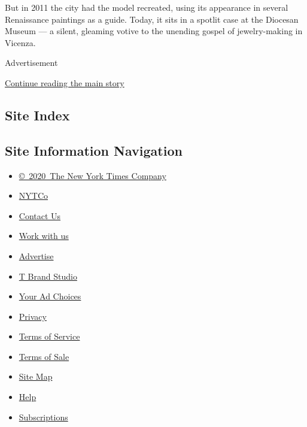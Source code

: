 But in 2011 the city had the model recreated, using its appearance in
several Renaissance paintings as a guide. Today, it sits in a spotlit
case at the Diocesan Museum --- a silent, gleaming votive to the
unending gospel of jewelry-making in Vicenza.

Advertisement

\protect\hyperlink{after-bottom}{Continue reading the main story}

\hypertarget{site-index}{%
\subsection{Site Index}\label{site-index}}

\hypertarget{site-information-navigation}{%
\subsection{Site Information
Navigation}\label{site-information-navigation}}

\begin{itemize}
\tightlist
\item
  \href{https://help.nytimes.com/hc/en-us/articles/115014792127-Copyright-notice}{©~2020~The
  New York Times Company}
\end{itemize}

\begin{itemize}
\tightlist
\item
  \href{https://www.nytco.com/}{NYTCo}
\item
  \href{https://help.nytimes.com/hc/en-us/articles/115015385887-Contact-Us}{Contact
  Us}
\item
  \href{https://www.nytco.com/careers/}{Work with us}
\item
  \href{https://nytmediakit.com/}{Advertise}
\item
  \href{http://www.tbrandstudio.com/}{T Brand Studio}
\item
  \href{https://www.nytimes.com/privacy/cookie-policy\#how-do-i-manage-trackers}{Your
  Ad Choices}
\item
  \href{https://www.nytimes.com/privacy}{Privacy}
\item
  \href{https://help.nytimes.com/hc/en-us/articles/115014893428-Terms-of-service}{Terms
  of Service}
\item
  \href{https://help.nytimes.com/hc/en-us/articles/115014893968-Terms-of-sale}{Terms
  of Sale}
\item
  \href{https://spiderbites.nytimes.com}{Site Map}
\item
  \href{https://help.nytimes.com/hc/en-us}{Help}
\item
  \href{https://www.nytimes.com/subscription?campaignId=37WXW}{Subscriptions}
\end{itemize}

